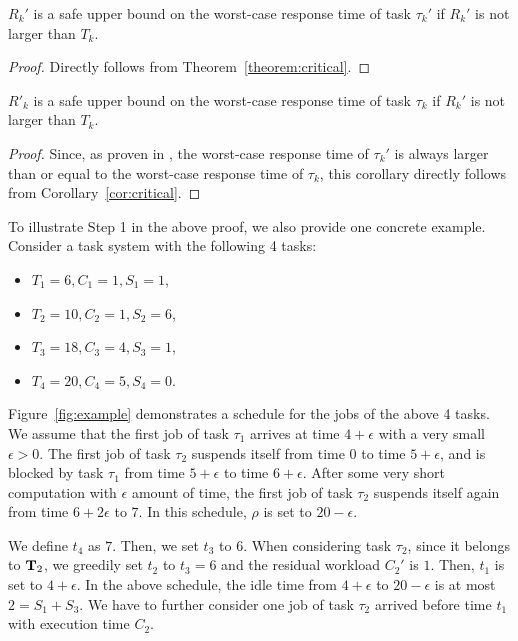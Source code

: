 \begin{corollary}
\label{cor:critical}
 $R_k'$ is a safe upper bound on the worst-case response time of task $\tau_k'$ if $R_k'$ is not larger than $T_k$.
\end{corollary}
\begin{proof}
Directly follows from Theorem~\ref{theorem:critical}.
\end{proof}



\begin{corollary}
$R'_k$ is a safe upper bound on the worst-case response time of task $\tau_k$ if $R_k'$ is not larger than $T_k$. 
\end{corollary}
\begin{proof}
Since, as proven in \cite{Rajkumar_1990,Liu_2014}, the worst-case response time of $\tau_k'$ is always larger than or equal to the worst-case response time of $\tau_k$, this corollary directly follows from Corollary~\ref{cor:critical}. 
\end{proof}


  
To illustrate Step 1 in the above proof, we also provide one concrete example. Consider a task system with the following 4 tasks:
\begin{itemize}
\item $T_1 = 6, C_1 = 1, S_1 = 1$,
\item $T_2 = 10, C_2 = 1, S_2 = 6$,
\item $T_3 = 18, C_3 = 4, S_3 = 1$,
\item $T_4 = 20, C_4 = 5, S_4 = 0$.
\end{itemize}

Figure~\ref{fig:example} demonstrates a schedule for the jobs of the
above 4 tasks. We assume that the first job of task $\tau_1$ arrives
at time $4+\epsilon$ with a very small $\epsilon > 0$. The first job
of task $\tau_2$ suspends itself from time $0$ to time $5+\epsilon$,
and is blocked by task $\tau_1$ from time $5+\epsilon$ to time
$6+\epsilon$. After some very short computation with $\epsilon$ amount
of time, the first job of task $\tau_2$ suspends itself again from
time $6+2\epsilon$ to $7$.   In this schedule, $\rho$ is set to $20-\epsilon$.

We define $t_4$ as $7$. Then, we set $t_3$ to $6$. When considering
task $\tau_2$, since it belongs to ${\bf T}_2$, we greedily set $t_2$
to $t_3=6$ and the residual workload $C_2'$ is $1$. Then, $t_1$ is set
to $4+\epsilon$. In the above schedule, the idle time from
$4+\epsilon$ to $20-\epsilon$ is at most $2 = S_1+S_3$. We have to
further consider one job of task $\tau_2$ arrived before time $t_1$
with execution time $C_2$.
  
  
  

